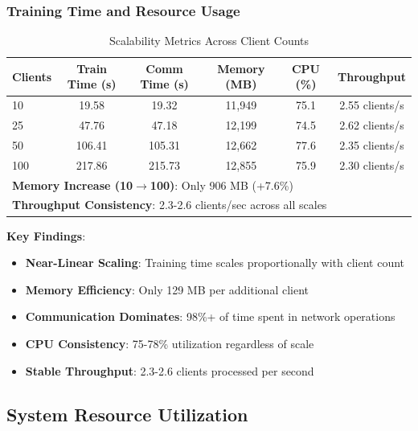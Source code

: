 \documentclass[12pt,a4paper]{article}
\begin{document}
\subsubsection{Training Time and Resource Usage}

\begin{table}[H]
\centering
\caption{Scalability Metrics Across Client Counts}
\begin{tabular}{lccccc}
\toprule
\textbf{Clients} & \textbf{Train Time (s)} & \textbf{Comm Time (s)} & \textbf{Memory (MB)} & \textbf{CPU (\%)} & \textbf{Throughput} \\
\midrule
10 & 19.58 & 19.32 & 11,949 & 75.1 & 2.55 clients/s \\
25 & 47.76 & 47.18 & 12,199 & 74.5 & 2.62 clients/s \\
50 & 106.41 & 105.31 & 12,662 & 77.6 & 2.35 clients/s \\
100 & 217.86 & 215.73 & 12,855 & 75.9 & 2.30 clients/s \\
\midrule
\multicolumn{6}{l}{\textbf{Memory Increase (10$\rightarrow$100)}: Only 906 MB (+7.6\%)} \\
\multicolumn{6}{l}{\textbf{Throughput Consistency}: 2.3-2.6 clients/sec across all scales} \\
\bottomrule
\end{tabular}
\end{table}

\textbf{Key Findings}:
\begin{itemize}
    \item \textbf{Near-Linear Scaling}: Training time scales proportionally with client count
    \item \textbf{Memory Efficiency}: Only 129 MB per additional client
    \item \textbf{Communication Dominates}: 98\%+ of time spent in network operations
    \item \textbf{CPU Consistency}: 75-78\% utilization regardless of scale
    \item \textbf{Stable Throughput}: 2.3-2.6 clients processed per second
\end{itemize}

\subsection{System Resource Utilization}
\end{document}
